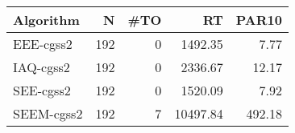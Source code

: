 \begin{tabular}{lrrrr}
\toprule
 Algorithm &   N &  \#TO &       RT &  PAR10 \\
\midrule
 EEE-cgss2 & 192 &    0 &  1492.35 &   7.77 \\
 IAQ-cgss2 & 192 &    0 &  2336.67 &  12.17 \\
 SEE-cgss2 & 192 &    0 &  1520.09 &   7.92 \\
SEEM-cgss2 & 192 &    7 & 10497.84 & 492.18 \\
\bottomrule
\end{tabular}
